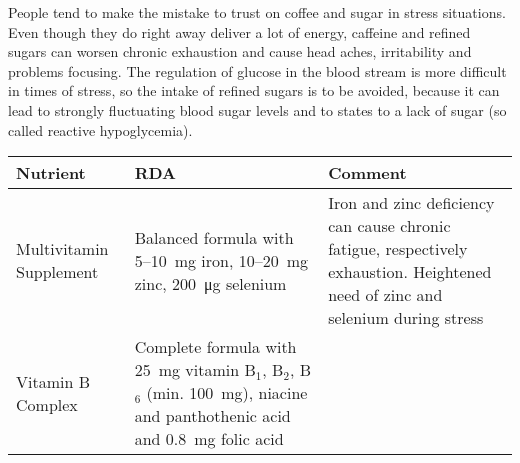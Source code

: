 \documentclass[../main.tex]{subfiles}
\begin{document}
  People tend to make the mistake to trust on coffee and sugar in stress situations.
  Even though they do right away deliver a lot of energy, caffeine and refined sugars
  can worsen chronic exhaustion
  and cause head aches, irritability
  and problems focusing.
  The regulation of glucose in the blood stream is more difficult in times of stress,
  so the intake of refined sugars is to be avoided, because it can lead to strongly fluctuating blood sugar levels
  and to states to a lack of sugar (so called reactive hypoglycemia).

  \begin{table}[htb!]
    \centering
    \begin{tabular}{p{2cm}p{4cm}p{5.5cm}}
      \textbf{Nutrient} &\textbf{RDA} & \textbf{Comment} \\
      \hline
      Multivitamin Supplement & Balanced formula with 5--\SI{10}{\milli\gram} iron\index{mineral!iron}, 10--\SI{20}{\milli\gram} zinc\index{mineral!zinc},
                                \SI{200}{\micro\gram} selenium\index{mineral!selenium}
                                      & Iron and zinc deficiency can cause chronic fatigue, respectively exhaustion. Heightened need of zinc and selenium during stress \\                                                                        Vitamin B Complex & Complete formula with \SI{25}{\milli\gram} vitamin B$_1$\index{vitamine!B1},  B$_2$\index{vitamine!B2},  B$_6$\index{vitamine!B6}
                                                                                                                                                                                                                                                                      (min. \SI{100}{\milli\gram}),
                                                                                                                                                                                                                                                                      niacine\index{micro nutrient!niacine} and panthothenic acid\index{micro nutrient!panthothenic acid}
                                                                                                                                                                                                                                                                      and \SI{0.8}{\milli\gram} folic acid\index{micro nutrient!folic acid}

\end{tabular}
\end{table}
\end{document}
